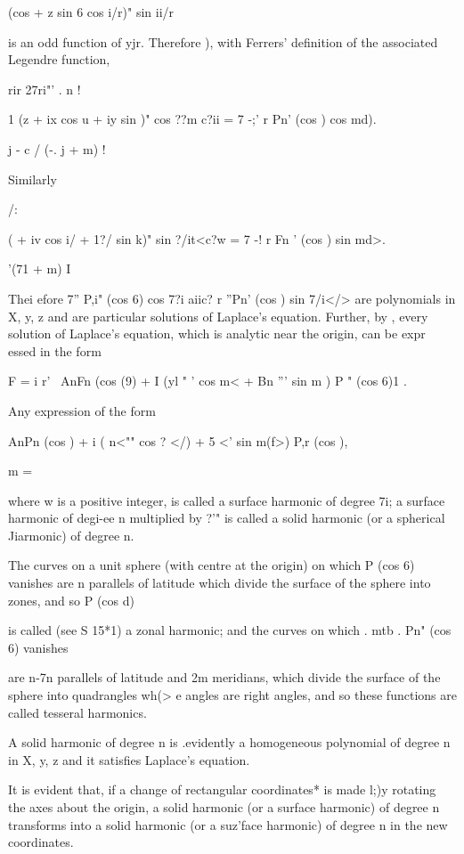 (cos + z sin 6 cos i/r)" sin ii/r

is an odd function of yjr. Therefore ), with Ferrers'
definition of the associated Legendre function,

rir 27ri"' . n !

1 (z + ix cos u + iy sin )" cos ??m c?ii = 7 -;' r Pn' (cos ) cos md).

j - c / (-. j + m) !

Similarly

/:

( + iv cos i/ + 1?/ sin k)" sin ?/it<c?w = 7 -! r Fn ' (cos ) sin md>.

'(71 + m) I

Thei efore 7'' P,i" (cos 6) cos 7?i aiic? r ''Pn' (cos ) sin 7/i</>
are polynomials in X, y, z and are particular solutions of Laplace's
equation. Further, by , every solution of Laplace's equation,
which is analytic near the origin, can be expr essed in the form

F = i r' \ AnFn (cos (9) + I (yl " ' cos m< + Bn ''' sin m ) P " (cos
6)1 .

Any expression of the form

AnPn (cos ) + i ( n<"" cos ? </) + 5 <' sin m(f>) P,r (cos ),

m = \

where w is a positive integer, is called a surface harmonic of degree
7i; a surface harmonic of degi-ee n multiplied by ?'" is called a
solid harmonic (or a spherical Jiarmonic) of degree n.

The curves on a unit sphere (with centre at the origin) on which P
(cos 6) vanishes are n parallels of latitude which divide the surface
of the sphere into zones, and so P (cos d)

is called (see S 15*1) a zonal harmonic; and the curves on which .
mtb . Pn" (cos 6) vanishes

are n-7n parallels of latitude and 2m meridians, which divide the
surface of the sphere into quadrangles wh(> e angles are right angles,
and so these functions are called tesseral harmonics.

%
%

A solid harmonic of degree n is .evidently a homogeneous polynomial of
degree n in X, y, z and it satisfies Laplace's equation.

It is evident that, if a change of rectangular coordinates* is made
l;)y rotating the axes about the origin, a solid harmonic (or a
surface harmonic) of degree n transforms into a solid harmonic (or a
suz'face harmonic) of degree n in the new coordinates.

